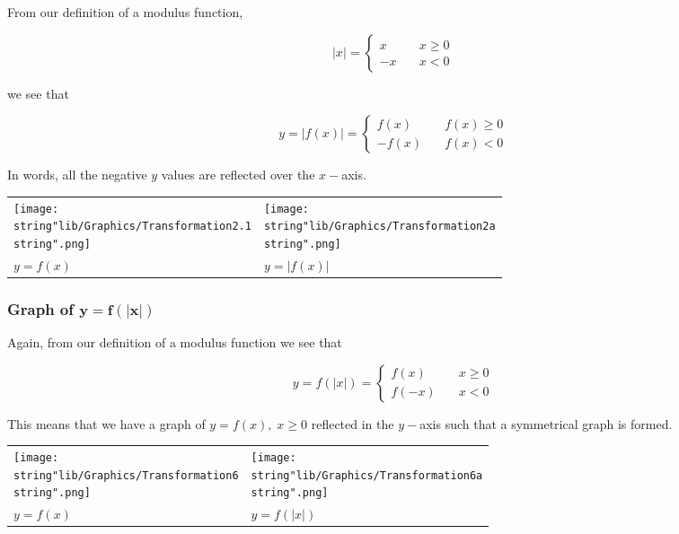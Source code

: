\documentclass[11pt,a4paper]{book}
\begin{document}
From our definition of a modulus function,

\[
\lvert x\rvert=\left\{ \begin{array}{ll}
x & \quad x\geq0\\
-x & \quad x<0
\end{array}\right.
\]

we see that

\[
y=\left|f\left(x\right)\right|=\left\{ \begin{array}{ll}
f\left(x\right) & \quad f\left(x\right)\geq0\\
-f\left(x\right) & \quad f\left(x\right)<0
\end{array}\right.
\]

In words, all the negative $y$ values are reflected over the $x-$axis.
\begin{center}
\begin{tabular}{>{\centering}p{6.2cm}>{\centering}p{6.2cm}}
\centering{}\texttt{[image: \\string"lib/Graphics/Transformation2.1\\string".png]} & \centering{}\texttt{[image: \\string"lib/Graphics/Transformation2a\\string".png]}\tabularnewline
\centering{}$y=f\left(x\right)$ & \centering{}$y=\left|f\left(x\right)\right|$\tabularnewline
\end{tabular}
\par\end{center}

\subsubsection{Graph of $\boldsymbol{y=f\left(\left|x\right|\right)}$}

Again, from our definition of a modulus function we see that

\[
y=f\left(\left|x\right|\right)=\left\{ \begin{array}{ll}
f\left(x\right) & \quad x\geq0\\
f\left(-x\right) & \quad x<0
\end{array}\right.
\]

This means that we have a graph of $y=f\left(x\right),\;x\geq0$ reflected
in the $y-$axis such that a symmetrical graph is formed.
\begin{center}
\begin{tabular}{>{\centering}p{6.2cm}>{\centering}p{6.2cm}}
\centering{}\texttt{[image: \\string"lib/Graphics/Transformation6\\string".png]} & \centering{}\texttt{[image: \\string"lib/Graphics/Transformation6a\\string".png]}\tabularnewline
\centering{}$y=f\left(x\right)$ & \centering{}$y=f\left(\left|x\right|\right)$\tabularnewline
\end{tabular}
\par\end{center}
\end{document}
